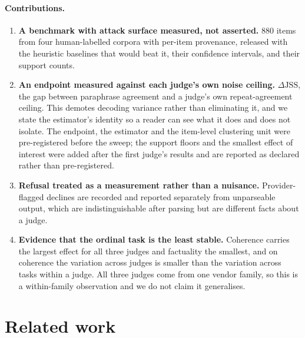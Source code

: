 \documentclass[11pt]{article}          %
\begin{document}
\paragraph{Contributions.}
\begin{enumerate}
  \item \textbf{A benchmark with attack surface measured, not asserted.} 880
    items from four human-labelled corpora with per-item provenance, released
    with the heuristic baselines that would beat it, their confidence intervals,
    and their support counts.
  \item \textbf{An endpoint measured against each judge's own noise ceiling.}
    $\Delta\mathrm{JSS}$, the gap between paraphrase agreement and a judge's own
    repeat-agreement ceiling. This demotes decoding variance rather than
    eliminating it, and we state the estimator's identity so a reader can see
    what it does and does not isolate. The endpoint, the estimator and the
    item-level clustering unit were pre-registered before the sweep; the support
    floors and the smallest effect of interest were added after the first
    judge's results and are reported as declared rather than pre-registered.
  \item \textbf{Refusal treated as a measurement rather than a nuisance.}
    Provider-flagged declines are recorded and reported separately from
    unparseable output, which are indistinguishable after parsing but are
    different facts about a judge.
  \item \textbf{Evidence that the ordinal task is the least stable.} Coherence
    carries the largest effect for all three judges and factuality the smallest,
    and on coherence the variation across judges is smaller than the variation
    across tasks within a judge. All three judges come from one vendor family, so
    this is a within-family observation and we do not claim it generalises.
\end{enumerate}
\section{Related work}
\label{sec:related}
\end{document}
